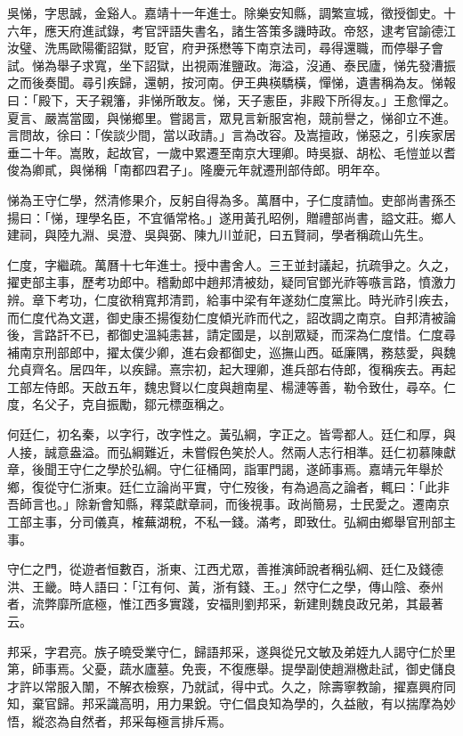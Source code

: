 \begin{pinyinscope}
吳悌，字思誠，金谿人。嘉靖十一年進士。除樂安知縣，調繁宣城，徵授御史。十六年，應天府進試錄，考官評語失書名，諸生答策多譏時政。帝怒，逮考官諭德江汝璧、洗馬歐陽衢詔獄，貶官，府尹孫懋等下南京法司，尋得還職，而停舉子會試。悌為舉子求寬，坐下詔獄，出視兩淮鹽政。海溢，沒通、泰民廬，悌先發漕振之而後奏聞。尋引疾歸，還朝，按河南。伊王典楧驕橫，憚悌，遺書稱為友。悌報曰：「殿下，天子親籓，非悌所敢友。悌，天子憲臣，非殿下所得友。」王愈憚之。夏言、嚴嵩當國，與悌鄉里。嘗謁言，眾見言新服宮袍，競前譽之，悌卻立不進。言問故，徐曰：「俟談少間，當以政請。」言為改容。及嵩擅政，悌惡之，引疾家居垂二十年。嵩敗，起故官，一歲中累遷至南京大理卿。時吳嶽、胡松、毛愷並以耆俊為卿貳，與悌稱「南都四君子」。隆慶元年就遷刑部侍郎。明年卒。

悌為王守仁學，然清修果介，反躬自得為多。萬曆中，子仁度請恤。吏部尚書孫丕揚曰：「悌，理學名臣，不宜循常格。」遂用黃孔昭例，贈禮部尚書，謚文莊。鄉人建祠，與陸九淵、吳澄、吳與弼、陳九川並祀，曰五賢祠，學者稱疏山先生。

仁度，字繼疏。萬曆十七年進士。授中書舍人。三王並封議起，抗疏爭之。久之，擢吏部主事，歷考功郎中。稽勳郎中趙邦清被劾，疑同官鄧光祚等嗾言路，憤激力辨。章下考功，仁度欲稍寬邦清罰，給事中梁有年遂劾仁度黨比。時光祚引疾去，而仁度代為文選，御史康丕揚復劾仁度傾光祚而代之，詔改調之南京。自邦清被論後，言路訐不已，都御史溫純恚甚，請定國是，以剖眾疑，而深為仁度惜。仁度尋補南京刑部郎中，擢太僕少卿，進右僉都御史，巡撫山西。砥廉隅，務慈愛，與魏允貞齊名。居四年，以疾歸。熹宗初，起大理卿，進兵部右侍郎，復稱疾去。再起工部左侍郎。天啟五年，魏忠賢以仁度與趙南星、楊漣等善，勒令致仕，尋卒。仁度，名父子，克自振勵，鄒元標亟稱之。

何廷仁，初名秦，以字行，改字性之。黃弘綱，字正之。皆雩都人。廷仁和厚，與人接，誠意盎溢。而弘綱難近，未嘗假色笑於人。然兩人志行相準。廷仁初慕陳獻章，後聞王守仁之學於弘綱。守仁征桶岡，詣軍門謁，遂師事焉。嘉靖元年舉於鄉，復從守仁浙東。廷仁立論尚平實，守仁歿後，有為過高之論者，輒曰：「此非吾師言也。」除新會知縣，釋菜獻章祠，而後視事。政尚簡易，士民愛之。遷南京工部主事，分司儀真，榷蕪湖稅，不私一錢。滿考，即致仕。弘綱由鄉舉官刑部主事。

守仁之門，從遊者恒數百，浙東、江西尤眾，善推演師說者稱弘綱、廷仁及錢德洪、王畿。時人語曰：「江有何、黃，浙有錢、王。」然守仁之學，傳山陰、泰州者，流弊靡所底極，惟江西多實踐，安福則劉邦采，新建則魏良政兄弟，其最著云。

邦采，字君亮。族子曉受業守仁，歸語邦采，遂與從兄文敏及弟姪九人謁守仁於里第，師事焉。父憂，蔬水廬墓。免喪，不復應舉。提學副使趙淵檄赴試，御史儲良才許以常服入闈，不解衣檢察，乃就試，得中式。久之，除壽寧教諭，擢嘉興府同知，棄官歸。邦采識高明，用力果銳。守仁倡良知為學的，久益敝，有以揣摩為妙悟，縱恣為自然者，邦采每極言排斥焉。


\end{pinyinscope}
